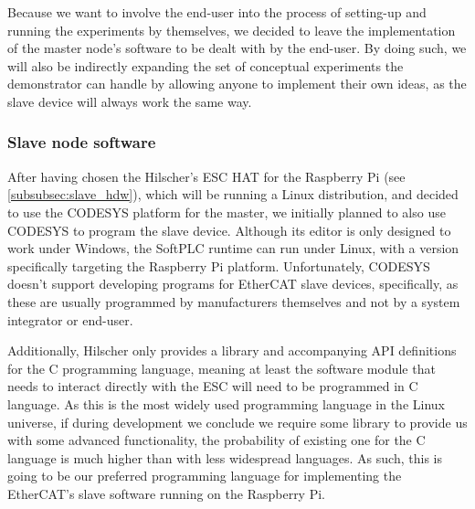 Because we want to involve the end-user into the process of setting-up and running the experiments by themselves, we decided to leave the implementation of the master node's software to be dealt with by the end-user.
By doing such, we will also be indirectly expanding the set of conceptual experiments the demonstrator can handle by allowing anyone to implement their own ideas, as the slave device will always work the same way.

\subsubsection{Slave node software}

After having chosen the Hilscher's ESC HAT for the Raspberry Pi (see \autoref{subsubsec:slave_hdw}), which will be running a Linux distribution, and decided to use the CODESYS platform for the master, we initially planned to also use CODESYS to program the slave device.
Although its editor is only designed to work under Windows, the SoftPLC runtime can run under Linux, with a version specifically targeting the Raspberry Pi platform.
Unfortunately, CODESYS doesn't support developing programs for EtherCAT slave devices, specifically, as these are usually programmed by manufacturers themselves and not by a system integrator or end-user.

Additionally, Hilscher only provides a library and accompanying API definitions for the C programming language, meaning at least the software module that needs to interact directly with the ESC will need to be programmed in C language.
As this is the most widely used programming language in the Linux universe, if during development we conclude we require some library to provide us with some advanced functionality, the probability of existing one for the C language is much higher than with less widespread languages.
As such, this is going to be our preferred programming language for implementing the EtherCAT's slave software running on the Raspberry Pi.


